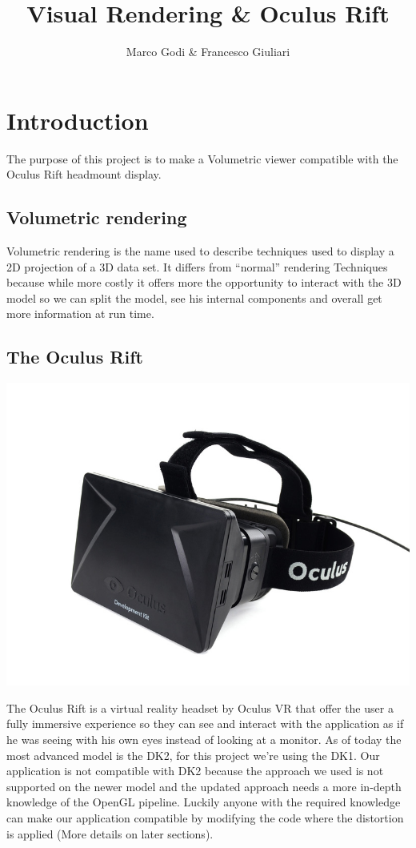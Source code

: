 \documentclass[11pt]{article} %
\title{Visual Rendering \& Oculus Rift}
\author{Marco Godi \& Francesco Giuliari}
\begin{document}
\maketitle


\tableofcontents





\newpage
\section {Introduction}
The purpose of this project is to make a Volumetric viewer compatible with the Oculus Rift headmount display.

\subsection{Volumetric rendering}
Volumetric rendering is the name used to describe techniques used to display a 2D projection of a 3D data set. It differs from ``normal'' rendering Techniques because while more costly it offers more the opportunity to interact with the 3D model so we can split the model, see his internal components and overall get more information at run time.  

\subsection{The Oculus Rift}
\includegraphics[scale=0.5]{oculus.jpg}

The Oculus Rift  is a virtual reality headset by Oculus VR that offer the user a fully immersive experience so they can see and interact with the application as if he was seeing with his own eyes instead of looking at a monitor. As of today the most advanced model is the DK2, for this project we're using the DK1. Our application is not compatible with DK2 because the approach we used is not supported on the newer model and the updated approach needs a more in-depth knowledge of the OpenGL pipeline. Luckily anyone with the required knowledge can make our application compatible by modifying the code where the distortion is applied (More details on later sections).
\end{document}
